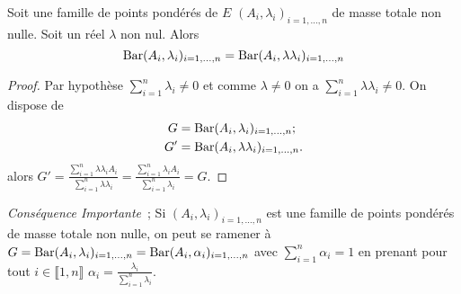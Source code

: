 \begin{prop}[Homogénéité]
  Soit une famille de points pondérés de \(E\) \((A_i,\lambda_i)_{i=1, \ldots,
  n}\) de masse totale non nulle. Soit un réel \(\lambda\) non nul.  Alors
  \begin{equation}
    \operatorname{Bar}(A_i,\lambda_i)_{i=1, \ldots, n} = \operatorname{Bar}(A_i,\lambda \lambda_i)_{i=1,
    \ldots, n}
  \end{equation}
\end{prop}

\begin{proof}
  Par hypothèse \(\sum_{i=1}^n \lambda_i \neq 0\) et comme \(\lambda \neq 0\) on
  a \(\sum_{i=1}^n \lambda \lambda_i \neq 0\). On dispose de
  \begin{align}
    G &= \operatorname{Bar}(A_i,\lambda_i)_{i=1, \ldots, n};\\
    G' &= \operatorname{Bar}(A_i,\lambda\lambda_i)_{i=1, \ldots, n}.
  \end{align}
  alors \(G'= \frac{\sum_{i=1}^n \lambda\lambda_i A_i}{\sum_{i=1}^n
  \lambda\lambda_i}=\frac{\sum_{i=1}^n \lambda_i A_i}{\sum_{i=1}^n
  \lambda_i}=G\).
\end{proof}

\emph{Conséquence Importante}~; Si \((A_i,\lambda_i)_{i=1, \ldots, n}\) est une
famille de points pondérés de masse totale non nulle, on peut se ramener à \(G =
\operatorname{Bar}(A_i,\lambda_i)_{i=1, \ldots, n}=\operatorname{Bar}(A_i,\alpha_i)_{i=1, \ldots, n}\)
avec \(\sum_{i=1}^n \alpha_i = 1\) en prenant pour tout \(i \in \llbracket 1,n
\rrbracket\) \(\alpha_i=\frac{\lambda_i}{\sum_{i=1}^n \lambda_i}\).

